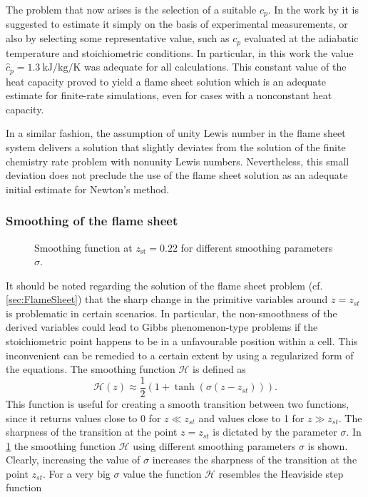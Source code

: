 The problem that now arises is the selection of a suitable $c_p$. In the work by \textcite{xuApplicationPrimitiveVariable1993} it is suggested to estimate it simply on the basis of experimental measurements, or also by selecting some representative value, such as $c_p$ evaluated at the adiabatic temperature and stoichiometric conditions. In particular, in this work the value $\hat c_p = \SI{1.3}{\kilo \joule \per \kilo \gram \per \kelvin}$ was adequate for all calculations. This constant value of the heat capacity proved to yield a flame sheet solution which is an adequate estimate for finite-rate simulations, even for cases with a nonconstant heat capacity. 

In a similar fashion, the assumption of unity Lewis number in the flame sheet system delivers a solution that slightly deviates from the solution of the finite chemistry rate problem with nonunity Lewis numbers. Nevertheless, this small deviation does not preclude the use of the flame sheet solution as an adequate initial estimate for Newton's method. 

\subsubsection{Smoothing of the flame sheet}
\begin{figure}[b]
	\centering
	\caption{Smoothing function  at $z_{\text{st}} = 0.22$ for different smoothing parameters $\sigma$. }\label{fig:SmoothingFunc}
\end{figure}
It should be noted regarding the solution of the flame sheet problem (cf. \cref{sec:FlameSheet}) that the sharp change in the primitive variables around $z = z_{st}$  is problematic in certain scenarios. In particular, the non-smoothness of the derived variables could lead to Gibbs phenomenon-type problems if the stoichiometric point happens to be in a unfavourable position within a cell. This inconvenient can be remedied to a certain extent by using a regularized form of the equations. The smoothing function $\mathcal{H}$ is defined as
\begin{equation}\label{eq:regularization_MF}
	\mathcal{H}(z) \approx \frac{1}{2}(1+\tanh(\sigma(z - z_{st}) )).
\end{equation}
This function is useful for creating a smooth transition between two functions, since it returns values close to 0 for $z \ll z_{st}$ and values close to 1 for $z \gg z_{st}$. The sharpness of the transition at the point $z = z_{st}$ is dictated by the parameter $\sigma$. In \cref{fig:SmoothingFunc} the smoothing function $\mathcal{H}$ using different smoothing parameters $\sigma$ is shown. Clearly, increasing the value of $\sigma$ increases the sharpness of the transition at the point $z_{st}$. For a very big $\sigma$ value the function $	\mathcal{H}$ resembles the Heaviside step function


